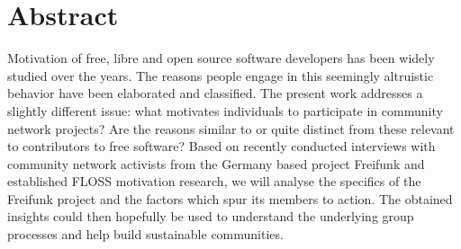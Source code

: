 \section*{Abstract}
  Motivation of free, libre and open source software developers has been widely studied over the years.
  The reasons people engage in this seemingly altruistic behavior have been elaborated and classified.
  The present work addresses a slightly different issue:
  what motivates individuals to participate in community network projects?
  Are the reasons similar to or quite distinct from these relevant to contributors to free software?
  Based on recently conducted interviews with community network activists from the Germany based project Freifunk and established FLOSS motivation research, we will analyse the specifics of the Freifunk project and the factors which spur its members to action.
  The obtained insights could then hopefully be used to understand the underlying group processes and help build sustainable communities.
